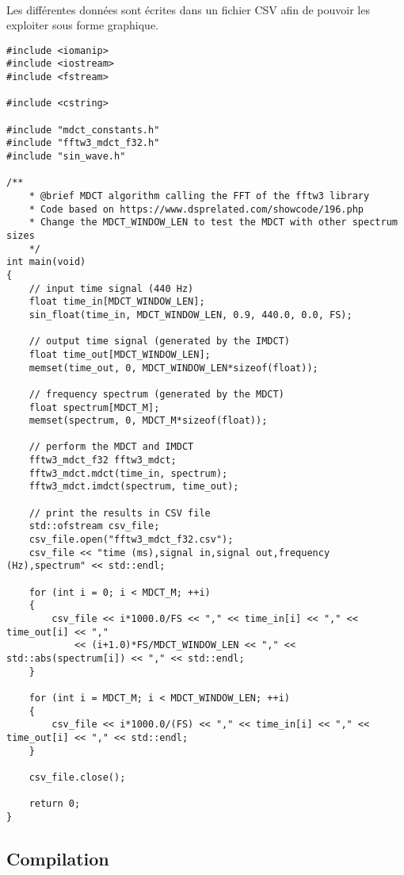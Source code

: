 \documentclass{article}
\begin{document}
\paragraph{}
Les différentes données sont écrites dans un fichier CSV afin de pouvoir les exploiter sous forme graphique.
\lstset{language=C++}
\begin{lstlisting}
#include <iomanip>
#include <iostream>
#include <fstream>

#include <cstring>

#include "mdct_constants.h"
#include "fftw3_mdct_f32.h"
#include "sin_wave.h"

/**
    * @brief MDCT algorithm calling the FFT of the fftw3 library
    * Code based on https://www.dsprelated.com/showcode/196.php
    * Change the MDCT_WINDOW_LEN to test the MDCT with other spectrum sizes
    */
int main(void)
{
    // input time signal (440 Hz)
    float time_in[MDCT_WINDOW_LEN];
    sin_float(time_in, MDCT_WINDOW_LEN, 0.9, 440.0, 0.0, FS);

    // output time signal (generated by the IMDCT)
    float time_out[MDCT_WINDOW_LEN];
    memset(time_out, 0, MDCT_WINDOW_LEN*sizeof(float));

    // frequency spectrum (generated by the MDCT)
    float spectrum[MDCT_M];
    memset(spectrum, 0, MDCT_M*sizeof(float));

    // perform the MDCT and IMDCT
    fftw3_mdct_f32 fftw3_mdct;
    fftw3_mdct.mdct(time_in, spectrum);
    fftw3_mdct.imdct(spectrum, time_out);

    // print the results in CSV file
    std::ofstream csv_file;
    csv_file.open("fftw3_mdct_f32.csv");
    csv_file << "time (ms),signal in,signal out,frequency (Hz),spectrum" << std::endl;

    for (int i = 0; i < MDCT_M; ++i)
    {
        csv_file << i*1000.0/FS << "," << time_in[i] << "," << time_out[i] << ","
            << (i+1.0)*FS/MDCT_WINDOW_LEN << "," << std::abs(spectrum[i]) << "," << std::endl;
    }

    for (int i = MDCT_M; i < MDCT_WINDOW_LEN; ++i)
    {
        csv_file << i*1000.0/(FS) << "," << time_in[i] << "," << time_out[i] << "," << std::endl;
    }

    csv_file.close();

    return 0;
}
\end{lstlisting}

\subsection{Compilation}\label{app:fftw3_example_compilation}
\end{document}
